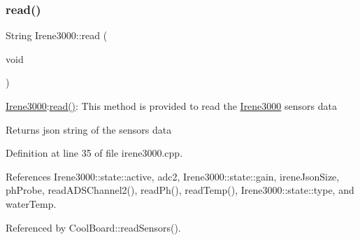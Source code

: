 \subsubsection{\texorpdfstring{read()}{read()}}
{\footnotesize\ttfamily String Irene3000\+::read (\begin{DoxyParamCaption}\item[{void}]{ }\end{DoxyParamCaption})}

\hyperlink{classIrene3000}{Irene3000}\+:\hyperlink{classIrene3000_a852a170feea994ea1df01c6b245b5d9a}{read()}\+: This method is provided to read the \hyperlink{classIrene3000}{Irene3000} sensors data

\begin{DoxyReturn}{Returns}
json string of the sensors data 
\end{DoxyReturn}


Definition at line 35 of file irene3000.\+cpp.



References Irene3000\+::state\+::active, adc2, Irene3000\+::state\+::gain, irene\+Json\+Size, ph\+Probe, read\+A\+D\+S\+Channel2(), read\+Ph(), read\+Temp(), Irene3000\+::state\+::type, and water\+Temp.



Referenced by Cool\+Board\+::read\+Sensors().


